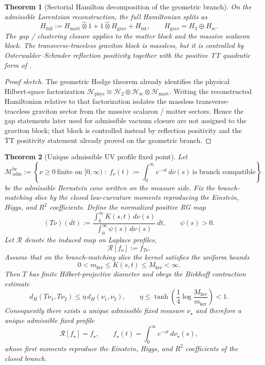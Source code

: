 \documentclass[11pt,a4paper]{article}
\newtheorem{theorem}{Theorem}[section]
\theoremstyle{definition}
\theoremstyle{remark}
\begin{document}
\begin{theorem}[Sectorial Hamilton decomposition of the geometric branch]
\label{thm:sectorial-hamilton-decomposition}
On the admissible Lorentzian reconstruction, the full Hamiltonian splits as
\[
H_{\mathrm{full}}
:=
H_{\mathrm{matt}}\widehat\otimes 1
+
1\widehat\otimes H_{\mathrm{grav}}
+
H_{\mathrm{int}},
\qquad
H_{\mathrm{grav}}=H_{2}\oplus H_{\mathrm{sc}}.
\]
The gap / clustering closure applies to the matter block and the massive scalaron block. The
transverse-traceless graviton block is massless, but it is controlled by Osterwalder--Schrader
reflection positivity together with the positive TT quadratic form of
.
\end{theorem}

\begin{proof}[Proof sketch]
The geometric Hodge theorem already identifies the physical Hilbert-space factorization
$\mathcal H_{\mathrm{phys}}\cong\mathcal H_2\otimes\mathcal H_{\mathrm{sc}}\otimes\mathcal H_{\mathrm{matt}}$.
Writing the reconstructed Hamiltonian relative to that factorization isolates the massless
transverse-traceless graviton sector from the massive scalaron / matter sectors. Hence the gap
statements later used for admissible vacuum closure are not assigned to the graviton block; that
block is controlled instead by reflection positivity and the TT positivity statement already proved
on the geometric branch.
\end{proof}

\begin{theorem}[Unique admissible UV profile fixed point]
\label{thm:geometric-uv-fixed-point}
Let
\[
\mathcal M_{\mathrm{adm}}^{\mathrm{br}}
:=
\left\{
\nu\ge 0\ \text{finite on }[0,\infty)\;:\;
f_\nu(t):=\int_0^\infty e^{-st}\,d\nu(s)\ \text{is branch compatible}
\right\}
\]
be the admissible Bernstein cone written on the measure side. Fix the branch-matching slice by the
closed low-curvature moments reproducing the Einstein, Higgs, and $R^2$ coefficients. Define the
normalized positive RG map
\[
(T\nu)(dt)
:=
\frac{\int_0^\infty K(s,t)\,d\nu(s)}{\int_0^\infty \psi(s)\,d\nu(s)}\,dt,
\qquad
\psi(s)>0.
\]
Let $\mathcal R$ denote the induced map on Laplace profiles,
\[
\mathcal R[f_\nu]:=f_{T\nu}.
\]
Assume that on the branch-matching slice the kernel satisfies the uniform bounds
\[
0<m_{\mathrm{ker}}\le K(s,t)\le M_{\mathrm{ker}}<\infty.
\]
Then $T$ has finite Hilbert-projective diameter and obeys the Birkhoff contraction estimate
\[
d_H(T\nu_1,T\nu_2)
\le
\eta\,d_H(\nu_1,\nu_2),
\qquad
\eta\le
\tanh\!\left(\frac14\log\frac{M_{\mathrm{ker}}}{m_{\mathrm{ker}}}\right)<1.
\]
Consequently there exists a unique admissible fixed measure $\nu_\star$ and therefore a unique
admissible fixed profile
\[
\mathcal R[f_\star]=f_\star,
\qquad
f_\star(t)=\int_0^\infty e^{-st}\,d\nu_\star(s),
\]
whose first moments reproduce the Einstein, Higgs, and $R^2$ coefficients of the closed branch.
\end{theorem}
\end{document}
